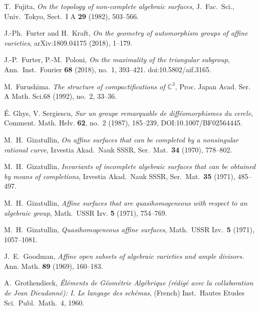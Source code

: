 T.~Fujita,
\emph{On the topology of non-complete algebraic surfaces},
J.\ Fac.\ Sci., Univ.\ Tokyo, Sect.\ I A \textbf{29} (1982), 503--566.

J.-Ph.~Furter and H.~Kraft,
\emph{On the geometry of automorphism
groups of affine varieties},  arXiv:1809.04175 (2018), 1--179.


J.-P.~Furter, P.-M.~Poloni,
\emph{On the maximality of the triangular subgroup},
Ann.\ Inst.\ Fourier \textbf{68} (2018), no.~1, 393--421.
doi:10.5802/aif.3165.

M.~Furushima. \emph{The structure of compactifications of $\mathbb{C}^3 $}, Proc. Japan Acad. Ser. A Math. Sci.68 (1992), no.~2, 33--36.

\'E. Ghys, V. Sergiescu, \emph{Sur un groupe remarquable de diff\'eomorphismes du cercle}, Comment.
Math. Helv. \textbf{62}, no.~2 (1987), 185--239, DOI:10.1007/BF02564445.

M.~H.~Gizatullin, \emph{On affine surfaces that can be completed by a nonsingular rational curve},
Izvestia Akad.\ Nauk SSSR, Ser.\ Mat.\ \textbf{34} (1970), 778--802.

M.~H.~Gizatullin, \emph{Invariants of incomplete algebraic surfaces that can be obtained by means
of completions}, Izvestia Akad.\ Nauk SSSR, Ser.\ Mat.\ \textbf{35} (1971), 485--497.

M.~H.~Gizatullin, \emph{Affine surfaces that are quasihomogeneous with respect to an algebraic group},
Math.\ USSR Izv. \textbf{5} (1971), 754--769.

M.~H.~Gizatullin, \emph{Quasihomogeneous affine surfaces}, Math.\ USSR Izv.\ \textbf{5} (1971), 1057--1081.


J.~E.~Goodman, \emph{Affine open subsets
of algebraic varieties
and ample divisors.} Ann. Math. \textbf{89} (1969), 160--183.

A.~Grothendieck,  \emph{ \'El\'ements de G\'eom\'etrie Alg\'ebrique (r\'edig\'e avec la collaboration de Jean Dieudonn\'e): I. Le langage des sch\'emas},
 (French) Inst.\ Hautes Etudes Sci.\ Publ.\ Math.\ 4, 1960.

